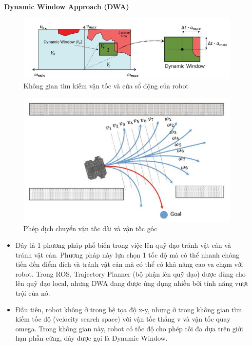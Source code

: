 \textbf{Dynamic Window Approach (DWA)}\\
\begin{figure}[tph]
	\centering
	\includegraphics[width=0.8\linewidth]{chapter2/figs/dwa}
	\caption{Không gian tìm kiếm vận tốc và cửa sổ động của robot}
	\label{fig:dwa}
\end{figure}
\begin{figure}[tph]
	\centering
	\includegraphics[width=0.7\linewidth]{chapter2/figs/dwa1}
	\caption{Phép dịch chuyển vận tốc dài và vận tốc góc}
	\label{fig:dwa1}
\end{figure}

\begin{itemize}
	\item Đây là  1 phương pháp phổ biến trong việc lên quỹ đạo tránh vật cản và tránh vật cản. Phương pháp này lựa chọn 1 tốc độ mà có thể nhanh chóng tiến đến điểm đích và tránh vật cản mà có thể có khả năng cao va chạm với robot. Trong ROS, Trajectory Planner (bộ phận lên quỹ đạo) được dùng cho lên quỹ đạo local, nhưng DWA đang được ứng dụng nhiều bởi tính năng vượt trội của nó. 
	\item Đầu tiên, robot không ở trong hệ tọa độ x-y, nhưng ở trong không gian tìm kiếm tốc độ (velocity search space) với vận tốc thẳng v và vận tốc quay omega. Trong không gian này, robot có tốc độ cho phép tối đa dựa trên giới hạn phần cứng, đây được gọi là Dynamic Window.
\end{itemize}
